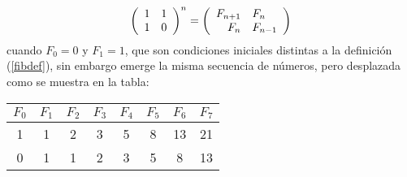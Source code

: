 \documentclass[a4paper,10pt]{article}
\begin{document}
\begin{equation}
  \left( \begin{array}{r l}
     1 & 1\\
     1 & 0\\
    \end{array}  \right)^n 
    = 
    \left( \begin{array}{r l}
     F_{n + 1} & F_{n}\\
     F_{n} & F_{n - 1}\\
    \end{array}  \right)    
    \label{fibmat}
\end{equation}
cuando $F_0 = 0$ y $F_1 = 1$, que son condiciones iniciales distintas a la definici\'on (\ref{fibdef}), sin embargo 
emerge la misma secuencia de n\'umeros, pero desplazada como se muestra en la tabla:
$$
$$
\qquad\qquad\qquad\qquad
\begin{tabular}[h]{|c|c|c|c|c|c|c|c|}
\hline
 $F_0$ & $F_1$ & $F_2$ & $F_3$ & $F_4$ & $F_5$ & $F_6$ & $F_7$\\\hline
 1   & 1   & 2   & 3   & 5   & 8   & 13  & 21 \\\hline
 0   & 1   & 1   & 2   & 3   & 5   & 8   & 13 \\\hline
\end{tabular}
\end{document}
